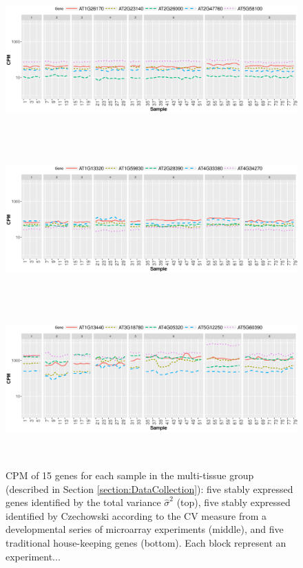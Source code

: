 \documentclass[11pt, a4paper]{article}
\begin{document}

 \begin{figure}[H]
\begin{center}
	\includegraphics[width=15cm,height=6cm]{Figures/A3.eps}
	\includegraphics[width=15cm,height=6cm]{Figures/A2.eps}
	\includegraphics[width=15cm,height=6cm]{Figures/A1.eps}
	\caption{{\small{\label{expressinlevel1}
			CPM of 15 genes for each sample in the multi-tissue group (described in Section \ref{section:DataCollection}):  five stably expressed genes identified by the total variance $\hat{\sigma}^2$ (top), five stably expressed identified by Czechowski according to the CV measure from a developmental series of microarray experiments (middle), and  five traditional house-keeping genes (bottom). Each block represent an experiment... }}}
\end{center}
\end{figure} 
\end{document}

